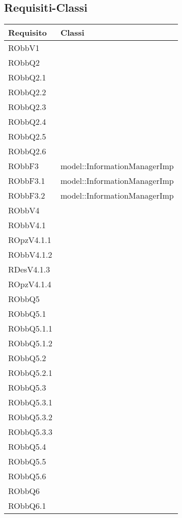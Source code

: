 \documentclass[../DefinizioneDiProdotto.tex]{subfiles}
\begin{document}
	\subsection{Requisiti-Classi}
\begin{longtabu}to \textwidth {X[0.3] X}
\toprule
\textbf{Requisito} & \textbf{Classi}\\
\midrule
\endhead
{}
RObbV1 &  \\ 
\midrule 
RObbQ2 &  \\ 
\midrule 
RObbQ2.1 &  \\ 
\midrule 
RObbQ2.2 &  \\ 
\midrule 
RObbQ2.3 &  \\ 
\midrule 
RObbQ2.4 &  \\ 
\midrule 
RObbQ2.5 &  \\ 
\midrule 
RObbQ2.6 &  \\ 
\midrule 
RObbF3 & model::\-InformationManagerImp \\ 
\midrule 
RObbF3.1 & model::\-InformationManagerImp \\ 
\midrule 
RObbF3.2 & model::\-InformationManagerImp \\ 
\midrule 
RObbV4 &  \\ 
\midrule 
RObbV4.1 &  \\ 
\midrule 
ROpzV4.1.1 &  \\ 
\midrule 
RObbV4.1.2 &  \\ 
\midrule 
RDesV4.1.3 &  \\ 
\midrule 
ROpzV4.1.4 &  \\ 
\midrule 
RObbQ5 &  \\ 
\midrule 
RObbQ5.1 &  \\ 
\midrule 
RObbQ5.1.1 &  \\ 
\midrule 
RObbQ5.1.2 &  \\ 
\midrule 
RObbQ5.2 &  \\ 
\midrule 
RObbQ5.2.1 &  \\ 
\midrule 
RObbQ5.3 &  \\ 
\midrule 
RObbQ5.3.1 &  \\ 
\midrule 
RObbQ5.3.2 &  \\ 
\midrule 
RObbQ5.3.3 &  \\ 
\midrule 
RObbQ5.4 &  \\ 
\midrule 
RObbQ5.5 &  \\ 
\midrule 
RObbQ5.6 &  \\ 
\midrule 
RObbQ6 &  \\ 
\midrule 
RObbQ6.1 &  \\ 

\end{longtabu}
\end{document}
